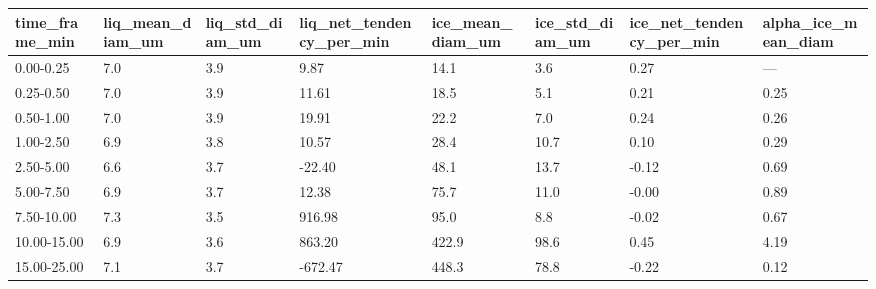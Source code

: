 \begin{tabular}{llllllll}
\toprule
time_frame_min & liq_mean_diam_um & liq_std_diam_um & liq_net_tendency_per_min & ice_mean_diam_um & ice_std_diam_um & ice_net_tendency_per_min & alpha_ice_mean_diam \\
\midrule
0.00-0.25 & 7.0 & 3.9 & 9.87 & 14.1 & 3.6 & 0.27 & — \\
0.25-0.50 & 7.0 & 3.9 & 11.61 & 18.5 & 5.1 & 0.21 & 0.25 \\
0.50-1.00 & 7.0 & 3.9 & 19.91 & 22.2 & 7.0 & 0.24 & 0.26 \\
1.00-2.50 & 6.9 & 3.8 & 10.57 & 28.4 & 10.7 & 0.10 & 0.29 \\
2.50-5.00 & 6.6 & 3.7 & -22.40 & 48.1 & 13.7 & -0.12 & 0.69 \\
5.00-7.50 & 6.9 & 3.7 & 12.38 & 75.7 & 11.0 & -0.00 & 0.89 \\
7.50-10.00 & 7.3 & 3.5 & 916.98 & 95.0 & 8.8 & -0.02 & 0.67 \\
10.00-15.00 & 6.9 & 3.6 & 863.20 & 422.9 & 98.6 & 0.45 & 4.19 \\
15.00-25.00 & 7.1 & 3.7 & -672.47 & 448.3 & 78.8 & -0.22 & 0.12 \\
\bottomrule
\end{tabular}
